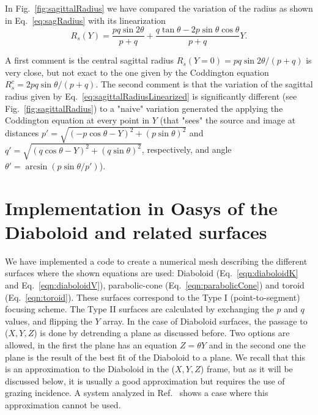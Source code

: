 \documentclass{iucr}              %
\begin{document}
In Fig.~\ref{fig:sagittalRadius} we have compared the variation of the radius as shown in Eq.~\ref{eq:sagRadius} with its linearization
\begin{equation}
\label{eq:sagittalRadiusLinearized}
R_s(Y) = \frac{p q \sin2\theta  }{p + q} + \frac{q \tan\theta - 2 p \sin\theta \cos\theta}{p + q} Y.
\end{equation}


A first comment is the central sagittal radius $R_s(Y=0)=p q \sin2\theta / (p+q)$ is very close, but not exact to the one given by the Coddington equation $R_s^c=2 p q \sin\theta / (p+q)$. The second comment is that the variation of the sagittal radius given by Eq.~\ref{eq:sagittalRadiusLinearized} is significantly different (see Fig.~\ref{fig:sagittalRadius}) to a "naive" variation generated the applying the Coddington equation at every point in $Y$ (that "sees" the source and image at distances $p'=\sqrt{(-p \cos\theta - Y)^2 + (p \sin\theta)^2}$ and $q'=\sqrt{(q \cos\theta - Y)^2 + (q \sin\theta)^2}$, respectively, and angle $\theta'=\arcsin(p \sin\theta / p')$).


\section{Implementation in Oasys of the Diaboloid and related surfaces}
\label{sec:oasys}

We have implemented a code to create a numerical mesh describing the different surfaces where the shown equations are used: Diaboloid (Eq.~\ref{eqn:diaboloidK} and Eq.~\ref{eqn:diaboloidV}), parabolic-cone (Eq.~\ref{eqn:parabolicCone}) and toroid (Eq.~\ref{eqn:toroid}). These surfaces correspond to the Type I (point-to-segment) focusing scheme. The Type II surfaces are calculated by exchanging the $p$ and $q$ values, and flipping the $Y$ array. In the case of Diaboloid surfaces, the passage to ($X,Y,Z$) is done by detrending a plane as discussed before. Two options are allowed, in the first the plane has an equation $Z=\theta Y$ and in the second one the plane is the result of the best fit of the Diaboloid to a plane. We recall that this is an approximation to the Diaboloid in the ($X,Y,Z$) frame, but as it will be discussed below, it is usually a good approximation but requires the use of grazing incidence. A system analyzed in Ref.~\cite{Yashchuk2019} shows a case where this approximation cannot be used.  
\end{document}
